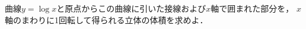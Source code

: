 \documentclass[../../main.tex]{subfiles}
\begin{document}
曲線$y=\log x$と原点からこの曲線に引いた接線および$x$軸で囲まれた部分を，
$x$軸のまわりに1回転して得られる立体の体積を求めよ．
\end{document}
